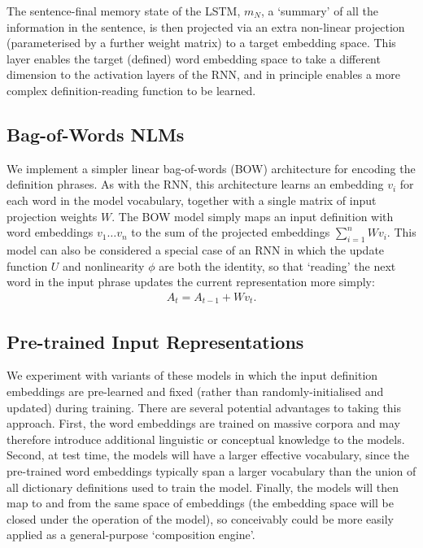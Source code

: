 The sentence-final memory state of the LSTM, \(m_N\), a `summary' of all the
information in the sentence, is then projected via an extra non-linear
projection (parameterised by a further weight matrix) to a target embedding
space. This  layer enables the target (defined) word embedding space to take a
different dimension to the activation layers of the RNN, and in principle
enables a more complex definition-reading function to be learned. 

\subsection{Bag-of-Words NLMs}

We implement a simpler linear bag-of-words (BOW) architecture for encoding the
definition phrases. As with the RNN, this architecture learns an embedding
\(v_i\) for each word in the model vocabulary, together with a single matrix of
input projection weights \(W\). The BOW model simply maps an input definition
with word embeddings \(v_1 \dots v_n\) to the sum of the projected embeddings
\(\sum_{i=1}^n Wv_i \). This model can also be considered a special case of an
RNN in which the update function \(U\) and nonlinearity \(\phi\) are both the
identity, so that `reading' the next word in the input phrase updates the
current representation more simply:
\begin{align*}
A_t =  A_{t-1} + Wv_t.
\end{align*}

\subsection{Pre-trained Input Representations}

We experiment with variants of these models in which the input definition embeddings are pre-learned and fixed (rather than randomly-initialised and updated) during training. There are several potential advantages to taking this approach. First, the word embeddings are trained on massive corpora and may therefore introduce additional linguistic or conceptual knowledge to the models. Second, at test time, the models will have a larger effective vocabulary, since the pre-trained word embeddings typically span a larger vocabulary than the union of all dictionary definitions used to train the model. Finally, the models will then map to and from the same space of embeddings (the embedding space will be closed under the operation of the model), so conceivably could be more easily applied as a general-purpose `composition engine'.

